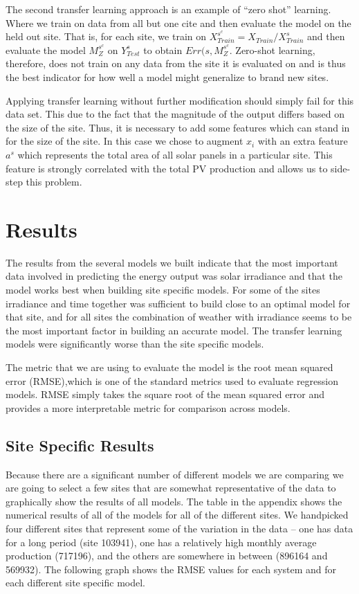 \documentclass[11pt, fullpage,letterpaper]{article}
\begin{document}
The second transfer learning approach is an example of “zero shot” learning. Where we train on data from all but one cite and then evaluate the model on the held out site. That is, for each site, we train on $X^{s^c}_{Train} = X_{Train} / X^s_{Train}$ and then evaluate the model $M^{s^c}_Z$ on $Y^s_{Test}$ to obtain $Err(s, M^{s^c}_Z$. Zero-shot learning, therefore, does not train on any data from the site it is evaluated on and is thus the best indicator for how well a model might generalize to brand new sites.

Applying transfer learning without further modification should simply fail for this data set. This due to the fact that the magnitude of the output differs based on the size of the site. Thus, it is necessary to add some features which can stand in for the size of the site. In this case we chose to augment $x_i$ with an extra feature $a^s$ which represents the total area of all solar panels in a particular site. This feature is strongly correlated with the total PV production and allows us to side-step this problem.

\section{Results}

The results from the several models we built indicate that the most important data involved in predicting the energy output was solar irradiance and that the model works best when building site specific models. For some of the sites irradiance and time together was sufficient to build close to an optimal model for that site, and for all sites the combination of weather with irradiance seems to be the most important factor in building an accurate model. The transfer learning models were significantly worse than the site specific models.

The metric that we are using to evaluate the model is the root mean squared error (RMSE),which is one of the standard metrics used to evaluate regression models. RMSE simply takes the square root of the mean squared error and provides a more interpretable metric for comparison across models.

\subsection{Site Specific Results}

Because there are a significant number of different models we are comparing we are going to select a few sites that are somewhat representative of the data to graphically show the results of all models. The table in the appendix shows the numerical results of all of the models for all of the different sites. We handpicked four different sites that represent some of the variation in the data – one has data for a long period (site 103941), one has a relatively high monthly average production (717196), and the others are somewhere in between (896164 and 569932). The following graph shows the RMSE values for each system and for each different site specific model. 
\end{document}
